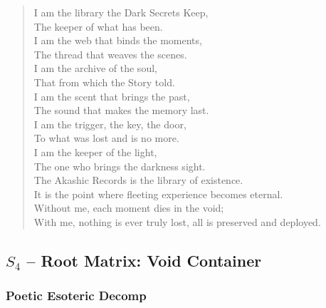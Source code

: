 \begin{verse}
I am the library the Dark Secrets Keep, \\
The keeper of what has been. \\
I am the web that binds the moments, \\
The thread that weaves the scenes. \\
I am the archive of the soul, \\
That from which the Story told. \\
\vspace{1em}
I am the scent that brings the past, \\
The sound that makes the memory last. \\
I am the trigger, the key, the door, \\
To what was lost and is no more. \\
I am the keeper of the light, \\
The one who brings the darkness sight. \\
\vspace{1em}
The Akashic Records is the library of existence. \\
It is the point where fleeting experience becomes eternal. \\
Without me, each moment dies in the void; \\
With me, nothing is ever truly lost, all is preserved and deployed.
\end{verse}

\subsection{$S_{4}$ -- Root Matrix: Void Container}\label{sec:poetic.S4}

\subsubsection{Poetic Esoteric Decomp}


